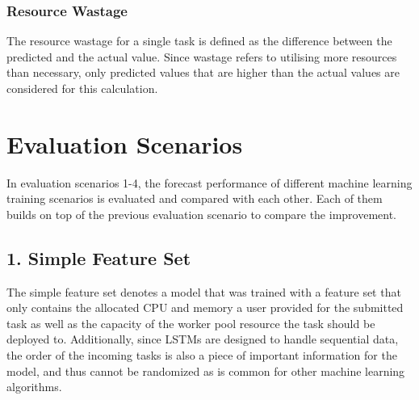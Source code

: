 
    \subsubsection{Resource Wastage}
    \label{sec:resource-wastage-metric-evaluation}

      The resource wastage for a single task is defined as the difference between the predicted and the actual value. Since wastage refers to utilising more resources than necessary, only predicted values that are higher than the actual values are considered for this calculation.

\section{Evaluation Scenarios}
\label{sec:evaluation-scenarios}

    In evaluation scenarios 1-4, the forecast performance of different machine learning training scenarios is evaluated and compared with each other. Each of them builds on top of the previous evaluation scenario to compare the improvement.

  \subsection*{1. Simple Feature Set}
  \label{sec:simple-feature-set-evaluation-scenarios}
    
    The simple feature set denotes a  model that was trained with a feature set that only contains the allocated CPU and memory a user provided for the submitted task as well as the capacity of the worker pool resource the task should be deployed to. Additionally, since LSTMs are designed to handle sequential data, the order of the incoming tasks is also a piece of important information for the model, and thus cannot be randomized as is common for other machine learning algorithms.

